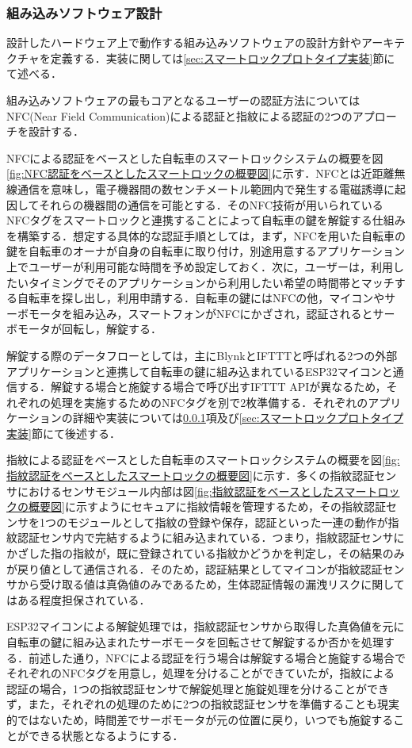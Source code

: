      \subsubsection{組み込みソフトウェア設計}
        \label{sec:組み込みソフトウェア設計}
          \par 設計したハードウェア上で動作する組み込みソフトウェアの設計方針やアーキテクチャを定義する．実装に関しては\ref{sec:スマートロックプロトタイプ実装}節にて述べる．
          \par 組み込みソフトウェアの最もコアとなるユーザーの認証方法についてはNFC(Near Field Communication)による認証と指紋による認証の2つのアプローチを設計する．
          \par NFCによる認証をベースとした自転車のスマートロックシステムの概要を図\ref{fig:NFC認証をベースとしたスマートロックの概要図}に示す．NFCとは近距離無線通信を意味し，電子機器間の数センチメートル範囲内で発生する電磁誘導に起因してそれらの機器間の通信を可能とする\cite{al2012near}．そのNFC技術が用いられているNFCタグをスマートロックと連携することによって自転車の鍵を解錠する仕組みを構築する．想定する具体的な認証手順としては，まず，NFCを用いた自転車の鍵を自転車のオーナが自身の自転車に取り付け，別途用意するアプリケーション上でユーザーが利用可能な時間を予め設定しておく．次に，ユーザーは，利用したいタイミングでそのアプリケーションから利用したい希望の時間帯とマッチする自転車を探し出し，利用申請する．自転車の鍵にはNFCの他，マイコンやサーボモータを組み込み，スマートフォンがNFCにかざされ，認証されるとサーボモータが回転し，解錠する．
          \par 解錠する際のデータフローとしては，主にBlynkとIFTTTと呼ばれる2つの外部アプリケーションと連携して自転車の鍵に組み込まれているESP32マイコンと通信する．解錠する場合と施錠する場合で呼び出すIFTTT APIが異なるため，それぞれの処理を実施するためのNFCタグを別で2枚準備する．それぞれのアプリケーションの詳細や実装については\ref{sec:組み込みソフトウェア設計}項及び\ref{sec:スマートロックプロトタイプ実装}節にて後述する．
          \par 指紋による認証をベースとした自転車のスマートロックシステムの概要を図\ref{fig:指紋認証をベースとしたスマートロックの概要図}に示す．多くの指紋認証センサにおけるセンサモジュール内部は図\ref{fig:指紋認証をベースとしたスマートロックの概要図}に示すようにセキュアに指紋情報を管理するため，その指紋認証センサを1つのモジュールとして指紋の登録や保存，認証といった一連の動作が指紋認証センサ内で完結するように組み込まれている．つまり，指紋認証センサにかざした指の指紋が，既に登録されている指紋かどうかを判定し，その結果のみが戻り値として通信される．そのため，認証結果としてマイコンが指紋認証センサから受け取る値は真偽値のみであるため，生体認証情報の漏洩リスクに関してはある程度担保されている．
          \par ESP32マイコンによる解錠処理では，指紋認証センサから取得した真偽値を元に自転車の鍵に組み込まれたサーボモータを回転させて解錠するか否かを処理する．前述した通り，NFCによる認証を行う場合は解錠する場合と施錠する場合でそれぞれのNFCタグを用意し，処理を分けることができていたが，指紋による認証の場合，1つの指紋認証センサで解錠処理と施錠処理を分けることができず，また，それぞれの処理のために2つの指紋認証センサを準備することも現実的ではないため，時間差でサーボモータが元の位置に戻り，いつでも施錠することができる状態となるようにする．

